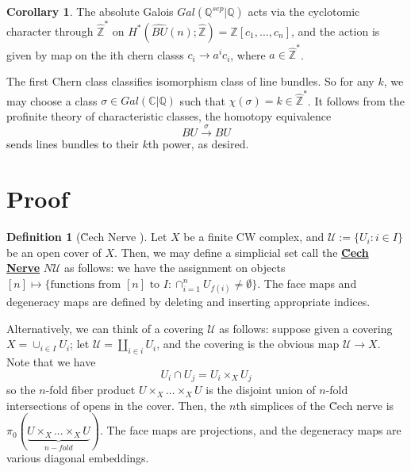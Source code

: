 \documentclass{article}
\theoremstyle{definition}
\theoremstyle{definition}
\newtheorem{definition}{Definition}[theorem]
\theoremstyle{definition}
\theoremstyle{definition}
\theoremstyle{definition}
\theoremstyle{definition}
\newtheorem{corollary}{Corollary}[theorem]
\theoremstyle{definition}
\begin{document}
\begin{tcolorbox}[colback=green!5!white,colframe=green!30!white]
\begin{corollary}
	The absolute Galois $Gal(\mathbb{Q}^{sep}|\mathbb{Q})$ acts via the cyclotomic character through $\widehat{\mathbb{Z}}^*$ on $H^*(\widehat{BU}(n);\widehat{\mathbb{Z}})=\widehat{\mathbb{Z}}[c_1,...,c_n]$, and the action is given by map on the ith chern classs $c_i\to a^ic_i$, where $a\in \widehat{\mathbb{Z}}^*$.
\end{corollary}
\end{tcolorbox}
The first Chern class classifies isomorphism class of line bundles. So for any $k$, we may choose a class $\sigma\in Gal(\mathbb{C}|\mathbb{Q})$ such that $\chi(\sigma)=k\in \widehat{\mathbb{Z}}^*$. It follows from the profinite theory of characteristic classes, the homotopy equivalence 
\[BU\xrightarrow{\sigma} BU\]
sends lines bundles to their $k$th power, as desired. 


\section{Proof}




















\begin{tcolorbox}[colback=purple!5!white,colframe=purple!75!black]
\begin{definition}[\u Cech Nerve ]
Let $X$ be a finite CW complex, and $\mathcal{U}:=\{U_i: i\in I\}$ be an open cover of $X$. Then, we may define a simplicial set call the \underline{\textbf{\u Cech Nerve}} $N \mathcal{U}$ as follows: we have the assignment on objects $[n]\mapsto \{\textrm{functions from }[n] \textrm{ to } I: \cap^n_{i=1}U_{f(i)}\neq \emptyset \}$. The face maps and degeneracy maps are defined by deleting and inserting appropriate indices. 
\end{definition}
\end{tcolorbox}

Alternatively, we can think of a covering $\mathcal{U}$ as follows: suppose given a covering $X=\cup_{i\in I}U_i$; let $\mathcal{U}=\coprod_{i\in i} U_i$, and the covering is the obvious map $\mathcal{U}\to X$. Note that we have 
\[U_i\cap U_j=U_i\times_X U_j\]
so the $n$-fold fiber product $U\times_X...\times_X U$ is the disjoint union of $n$-fold intersections of opens in the cover. Then, the $n$th simplices of the \u Cech nerve is $\pi_0(  \underbrace{U\times_X...\times_X U }_{n-fold})$. The face maps are projections, and the degeneracy maps are various diagonal embeddings.
\end{document}
